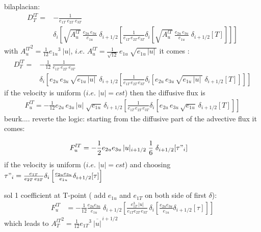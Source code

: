 \documentclass[../tex_main/NEMO_manual]{subfiles}
\begin{document}
bilaplacian:
\begin{equation} \label{eq:tra_ldf_lap}
\begin{split}
D_T^{lT} =&-\frac{1}{e_{1T} \; e_{2T}\;  e_{3T}} \\
& \delta _i \left[  \sqrt{A_u^{lT}}\ \frac{e_{2u}\,e_{3u}}{e_{1u}}\;\delta _{i+1/2} 
		  \left[ \frac{1}{e_{1T}\,e_{2T}\, e_{3T}}
    \delta _i \left[ \sqrt{A_u^{lT}}\ \frac{e_{2u}\,e_{3u}}{e_{1u}}\;\delta _{i+1/2} 
    		  [T] \right] \right] \right]
\end{split}
\end{equation}
with ${A_u^{lT}}^2 = \frac{1}{12} {e_{1u}}^3\ |u|$, 
$i.e.$ $A_u^{lT} = \frac{1}{\sqrt{12}} \,e_{1u}\ \sqrt{ e_{1u}\,|u|\,}$
it comes :
\begin{equation} \label{eq:tra_ldf_lap}
\begin{split}
D_T^{lT} =&-\frac{1}{12}\,\frac{1}{e_{1T} \; e_{2T}\;  e_{3T}} \\
& \delta _i \left[ e_{2u}\,e_{3u}\,\sqrt{ e_{1u}\,|u|\,}\;\delta _{i+1/2} 
		 \left[ \frac{1}{e_{1T}\,e_{2T}\, e_{3T}} 
    \delta _i \left[ e_{2u}\,e_{3u}\,\sqrt{ e_{1u}\,|u|\,}\;\delta _{i+1/2} 
    		[T] \right] \right] \right]
\end{split}
\end{equation}
if the velocity is uniform ($i.e.$ $|u|=cst$) then the diffusive flux is
\begin{equation} \label{eq:tra_ldf_lap}
\begin{split}
F_u^{lT} = - \frac{1}{12}
 e_{2u}\,e_{3u}\,|u| \;\sqrt{ e_{1u}}\,\delta _{i+1/2} 
		 \left[ \frac{1}{e_{1T}\,e_{2T}\, e_{3T}} 
    \delta _i \left[ e_{2u}\,e_{3u}\,\sqrt{ e_{1u}}\:\delta _{i+1/2} 
    		[T] \right] \right]
\end{split}
\end{equation}
beurk....  reverte the logic: starting from the diffusive part of the advective flux it comes:

\begin{equation} \label{eq:tra_adv_ubs2}
\begin{split}
F_u^{lT}
&= - \frac{1}{2} e_{2u} e_{3u}\,|u|_{i+1/2} \;\frac{1}{6} \;\delta_{i+1/2}[\tau"_i]
\end{split}
\end{equation}
if the velocity is uniform ($i.e.$ $|u|=cst$) and choosing $\tau "_i =\frac{e_{1T}}{e_{2T}\,e_{3T}}\delta _i \left[ \frac{e_{2u} e_{3u} }{e_{1u} } \delta _{i+1/2}[\tau] \right]$

sol 1 coefficient at T-point ( add $e_{1u}$ and $e_{1T}$ on both side of first $\delta$):
\begin{equation} \label{eq:tra_adv_ubs2}
\begin{split}
F_u^{lT}
&= - \frac{1}{12} \frac{e_{2u} e_{3u}}{e_{1u}}\;\delta_{i+1/2}\left[ \frac{e_{1T}^3\,|u|}{e_{1T}e_{2T}\,e_{3T}}\,\delta _i \left[ \frac{e_{2u} e_{3u} }{e_{1u} } \delta _{i+1/2}[\tau] \right] \right]
\end{split}
\end{equation}
which leads to ${A_T^{lT}}^2 = \frac{1}{12} {e_{1T}}^3\ \overline{|u|}^{\,i+1/2}$
\end{document}
